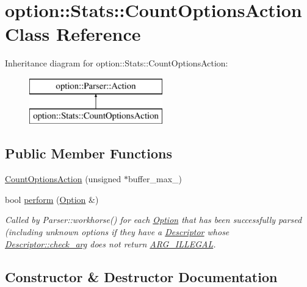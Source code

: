 \hypertarget{classoption_1_1Stats_1_1CountOptionsAction}{}\section{option\+:\+:Stats\+:\+:Count\+Options\+Action Class Reference}
\label{classoption_1_1Stats_1_1CountOptionsAction}
Inheritance diagram for option\+:\+:Stats\+:\+:Count\+Options\+Action\+:\begin{figure}[H]
\begin{center}
\leavevmode
\includegraphics[height=2.000000cm]{classoption_1_1Stats_1_1CountOptionsAction}
\end{center}
\end{figure}
\subsection*{Public Member Functions}
\begin{DoxyCompactItemize}
\item 
\hyperlink{classoption_1_1Stats_1_1CountOptionsAction_a24a38b87ad129b0e12660bd2019ba284}{Count\+Options\+Action} (unsigned $\ast$buffer\+\_\+max\+\_\+)
\item 
bool \hyperlink{classoption_1_1Stats_1_1CountOptionsAction_a29ab8a68d0a30736b99b4d2e5dece489}{perform} (\hyperlink{classoption_1_1Option}{Option} \&)
\begin{DoxyCompactList}\small\item\em Called by Parser\+::workhorse() for each \hyperlink{classoption_1_1Option}{Option} that has been successfully parsed (including unknown options if they have a \hyperlink{structoption_1_1Descriptor}{Descriptor} whose \hyperlink{structoption_1_1Descriptor_aa5d675dba0214a4abd73007ff163cc67}{Descriptor\+::check\+\_\+arg} does not return \hyperlink{namespaceoption_aee8c76a07877335762631491e7a5a1a9a9528e32563b795bd2930b12d0a5e382d}{A\+R\+G\+\_\+\+I\+L\+L\+E\+G\+AL}. \end{DoxyCompactList}\end{DoxyCompactItemize}


\subsection{Constructor \& Destructor Documentation}
\mbox{\label{classoption_1_1Stats_1_1CountOptionsAction_a24a38b87ad129b0e12660bd2019ba284}} 
